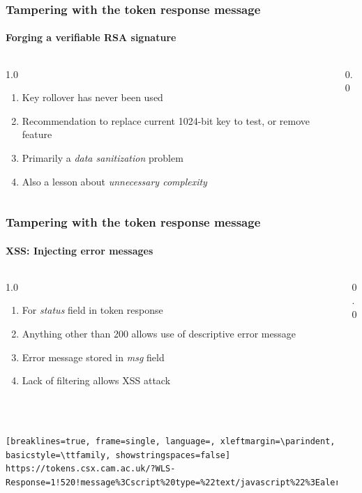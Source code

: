 \documentclass[handout, aspectratio=169, notes=hide]{beamer}
\begin{document}

\begin{frame}
\frametitle{Tampering with the token response message}
\framesubtitle{Forging a verifiable RSA signature}
\setlength{\parskip}{1.0em}
\begin{columns}[T]
\begin{column}[T]{1.0\textwidth}	
\setlength{\parskip}{1.0em}

\begin{enumerate}
\setlength{\parskip}{1.0em}
\item Key rollover has never been used
\item Recommendation to replace current 1024-bit key to test, or remove feature
\item Primarily a {\it data sanitization\/} problem
\item Also a lesson about {\it unnecessary complexity\/}
\end{enumerate}
\end{column}

\begin{column}[T]{0.0\textwidth}
\end{column}
\end{columns}

\end{frame}
\note{
}


\begin{frame}[fragile]
\frametitle{Tampering with the token response message}
\framesubtitle{XSS: Injecting error messages}
\setlength{\parskip}{1.0em}
\begin{columns}[T]
\begin{column}[T]{1.0\textwidth}	
\setlength{\parskip}{1.0em}

\begin{enumerate}
\setlength{\parskip}{1.0em}
\item For {\it status\/} field in token response
\item Anything other than 200 allows use of descriptive error message
\item Error message stored in {\it msg\/} field
\item Lack of filtering allows XSS attack
\end{enumerate}
\quad \\ \quad \\
\begin{lstlisting}[breaklines=true, frame=single, language=, xleftmargin=\parindent, basicstyle=\ttfamily, showstringspaces=false]
https://tokens.csx.cam.ac.uk/?WLS-Response=1!520!message%3Cscript%20type=%22text/javascript%22%3Ealert(%27XSS%27)%3C/script%3E!a!a!https://tokens.csx.cam.ac.uk/
\end{lstlisting}
\end{column}

\begin{column}[T]{0.0\textwidth}
\end{column}
\end{columns}

\end{frame}
\note{
}
\end{document}

